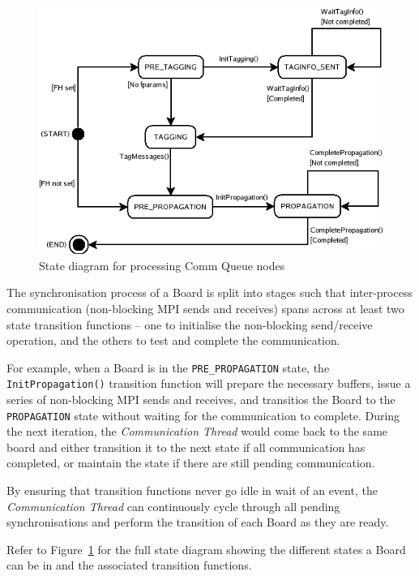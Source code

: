 \begin{figure}[h]
 \centering
  \includegraphics[scale=0.50]{CommNode.png}
 \caption{State diagram for processing Comm Queue nodes}
 \label{fig:commstate}
\end{figure}

The synchronisation process of a Board is split into stages such that inter-process communication (non-blocking MPI sends and receives) spans across at least two state transition functions -- one to initialise the non-blocking send/receive operation, and the others to test and complete the communication.

For example, when a Board is in the \texttt{PRE\_PROPAGATION} state, the \texttt{InitPropagation()} transition function will prepare the necessary buffers, issue a series of non-blocking MPI sends and receives, and transitios the Board to the \texttt{PROPAGATION} state without waiting for the communication to complete. During the next iteration, the \textit{Communication Thread} would come back to the same board and either transition it to the next state if all communication has completed, or maintain the state if there are still pending communication. 

By ensuring that transition functions never go idle in wait of an event, the \textit{Communication Thread} can continuously cycle through all pending synchronisations and perform the transition of each Board as they are ready.

Refer to Figure~\ref{fig:commstate} for the full state diagram showing the different states a Board can be in and the associated transition functions.








